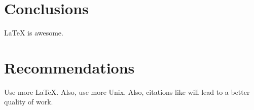 \documentclass{workreport}
\begin{document}
\begin{body}
\section{Conclusions}
	
	\gls{LaTeX} is awesome.

\section{Recommendations}

	Use more \LaTeX. Also, use more \gls{Unix}. Also, citations like
    	\cite{schweiger_principles_2001} will lead to a better quality of work.

\end{body}



\end{document}

